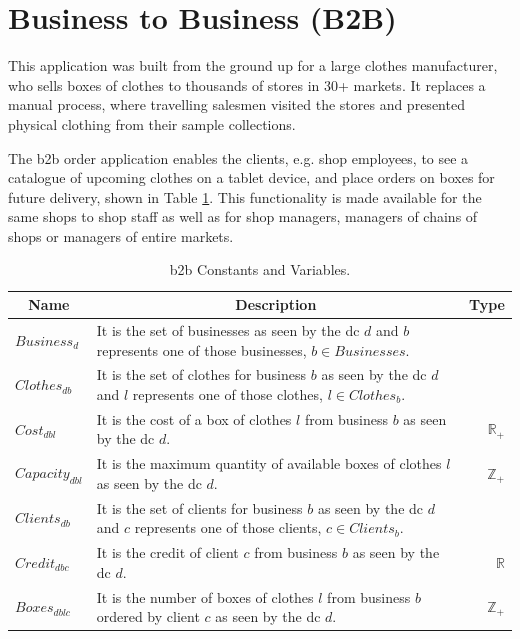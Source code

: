 \section{Business to Business (B2B)}
This application was built from the ground up for a large clothes manufacturer, who sells boxes of clothes to thousands of stores in 30+ markets. It replaces a manual process, where travelling salesmen visited the stores and presented physical clothing from their sample collections.

The \gls{b2b} order application enables the clients, e.g. shop employees, to see a catalogue of upcoming clothes on a tablet device, and place orders on boxes for future delivery, shown in Table \ref{tab:b2b_constants_variables}. This functionality is made available for the same shops to shop staff as well as for shop managers, managers of chains of shops or managers of entire markets.
\begin{table}[ht!]
	\begin{tabular}{|p{1.8cm}|p{12cm}|r| }
		\hline
			\multicolumn{1}{|c|}{Name} & \multicolumn{1}{c|}{Description} & \multicolumn{1}{c|}{Type} \\
		\hline
		\hline
			$Business_{d}$ & It is the set of businesses as seen by the \gls{dc} $d$ and $b$ represents one of those businesses, $b \in Businesses$. &  \\
		\hline
			$Clothes_{db}$ & It is the set of clothes for business $b$ as seen by the \gls{dc} $d$ and $l$ represents one of those clothes, $l \in Clothes_{b}$. & \\
		\hline
			$Cost_{dbl}$ & It is the cost of a box of clothes $l$ from business $b$ as seen by the \gls{dc} $d$. & $\mathbb{R}_{+}$ \\
		\hline
			$Capacity_{dbl}$ & It is the maximum quantity of available boxes of clothes $l$ as seen by the \gls{dc} $d$. &  $\mathbb{Z}_{+}$ \\
		\hline
			$Clients_{db}$ & It is the set of clients for business $b$ as seen by the \gls{dc} $d$ and $c$ represents one of those clients, $c \in Clients_{b}$. & \\
		\hline
			$Credit_{dbc}$ & It is the credit of client $c$ from business $b$ as seen by the \gls{dc} $d$. & $\mathbb{R}$ \\
		\hline
			$Boxes_{dblc}$ & It is the number of boxes of clothes $l$ from business $b$ ordered by client $c$ as seen by the \gls{dc} $d$. & $\mathbb{Z}_{+}$ \\
		\hline
	\end{tabular}
	
	\caption{\gls{b2b} Constants and Variables.}
	\label{tab:b2b_constants_variables}
\end{table}

